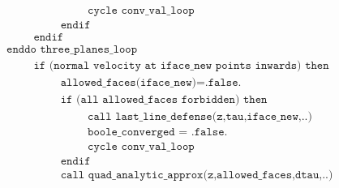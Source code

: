 \documentclass[./main.tex]{subfiles}
\begin{document}
\begin{align*}
&\hspace{4cm} \texttt{cycle conv\_val\_loop}\nonumber\\
&\hspace{3cm} \texttt{endif}\nonumber\\
&\hspace{2cm} \texttt{endif}\nonumber\\
&\hspace{1cm} \texttt{enddo three\_planes\_loop}\nonumber\\
&\hspace{2cm} \texttt{if (normal velocity at iface\_new points inwards) then}\nonumber\\
&\hspace{3cm} \texttt{allowed\_faces(iface\_new)=.false.}\nonumber\\
&\hspace{3cm} \texttt{if (all allowed\_faces forbidden) then}\nonumber\\
&\hspace{4cm} \texttt{call last\_line\_defense(z,tau,iface\_new,..)}\nonumber\\
&\hspace{4cm} \texttt{boole\_converged = .false.}\nonumber\\
&\hspace{4cm} \texttt{cycle conv\_val\_loop}\nonumber\\
&\hspace{3cm} \texttt{endif}\nonumber\\
&\hspace{3cm} \texttt{call quad\_analytic\_approx(z,allowed\_faces,dtau,..)}\nonumber\\
\end{align*}
\end{document}
